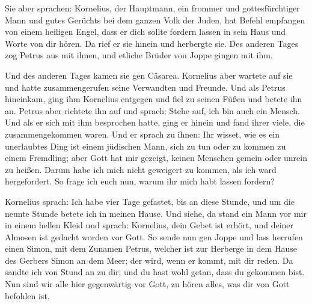  Sie aber sprachen: Kornelius, der Hauptmann, ein frommer
und gottesfürchtiger Mann und gutes Gerüchts bei dem ganzen Volk der
Juden, hat Befehl empfangen von einem heiligen Engel, dass er dich
sollte fordern lassen in sein Haus und Worte von dir hören.
 Da rief er sie hinein und herbergte sie. Des anderen Tages
zog Petrus aus mit ihnen, und etliche Brüder von Joppe gingen mit ihm.

 Und des anderen Tages kamen sie gen Cäsarea. Kornelius
aber wartete auf sie und hatte zusammengerufen seine Verwandten und
Freunde.  Und als Petrus hineinkam, ging ihm Kornelius
entgegen und fiel zu seinen Füßen und betete ihn an. 
Petrus aber richtete ihn auf und sprach: Stehe auf, ich bin auch ein
Mensch.  Und als er sich mit ihm besprochen hatte, ging er
hinein und fand ihrer viele, die zusammengekommen waren. 
Und er sprach zu ihnen: Ihr wisset, wie es ein unerlaubtes Ding ist
einem jüdischen Mann, sich zu tun oder zu kommen zu einem Fremdling;
aber Gott hat mir gezeigt, keinen Menschen gemein oder unrein zu heißen.
 Darum habe ich mich nicht geweigert zu kommen, als ich
ward hergefordert. So frage ich euch nun, warum ihr mich habt lassen
fordern?

 Kornelius sprach: Ich habe vier Tage gefastet, bis an
diese Stunde, und um die neunte Stunde betete ich in meinen Hause. Und
siehe, da stand ein Mann vor mir in einem hellen Kleid  und
sprach: Kornelius, dein Gebet ist erhört, und deiner Almosen ist gedacht
worden vor Gott.  So sende nun gen Joppe und lass herrufen
einen Simon, mit dem Zunamen Petrus, welcher ist zur Herberge in dem
Hause des Gerbers Simon an dem Meer; der wird, wenn er kommt, mit dir
reden.  Da sandte ich von Stund an zu dir; und du hast wohl
getan, dass du gekommen bist. Nun sind wir alle hier gegenwärtig vor
Gott, zu hören alles, was dir von Gott befohlen ist.

